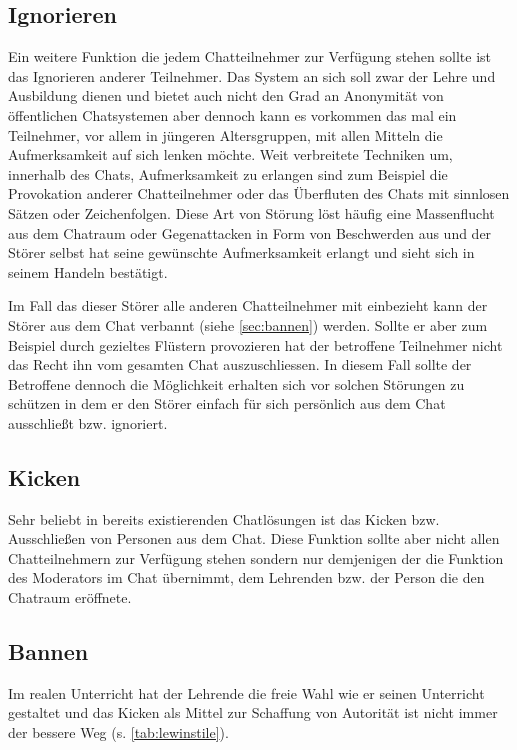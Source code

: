 \subsection{Ignorieren}
Ein weitere Funktion die jedem Chatteilnehmer zur Verf\"ugung stehen sollte ist das Ignorieren
anderer Teilnehmer. Das System an sich soll zwar der Lehre und Ausbildung dienen und bietet
auch nicht den Grad an Anonymit\"at von \"offentlichen Chatsystemen aber dennoch kann es
vorkommen das mal ein Teilnehmer, vor allem in j\"ungeren Altersgruppen, mit allen Mitteln die 
Aufmerksamkeit auf sich lenken m\"ochte. Weit verbreitete Techniken um, innerhalb des Chats, 
Aufmerksamkeit zu erlangen sind zum Beispiel die Provokation anderer Chatteilnehmer oder das 
\"Uberfluten des Chats mit sinnlosen S\"atzen oder Zeichenfolgen. Diese Art von St\"orung l\"ost 
h\"aufig eine Massenflucht aus dem Chatraum oder Gegenattacken in Form von Beschwerden aus und 
der St\"orer selbst hat seine gew\"unschte Aufmerksamkeit erlangt und sieht sich in seinem Handeln 
best\"atigt.

Im Fall das dieser St\"orer alle anderen Chatteilnehmer mit einbezieht kann der St\"orer aus dem Chat 
verbannt (siehe \ref{sec:bannen}) werden. Sollte er aber zum Beispiel durch gezieltes Fl\"ustern
provozieren hat der betroffene Teilnehmer nicht das Recht ihn vom gesamten Chat auszuschliessen. In
diesem Fall sollte der Betroffene dennoch die M\"oglichkeit erhalten sich vor solchen St\"orungen
zu sch\"utzen in dem er den St\"orer einfach f\"ur sich pers\"onlich aus dem Chat ausschlie{\ss}t
bzw. ignoriert.

\subsection{Kicken}
Sehr beliebt in bereits existierenden Chatl\"osungen ist das Kicken bzw. Ausschlie{\ss}en von Personen
aus dem Chat. Diese Funktion sollte aber nicht allen Chatteilnehmern zur Verf\"ugung stehen
sondern nur demjenigen der die Funktion des Moderators im Chat \"ubernimmt, dem Lehrenden bzw.
der Person die den Chatraum er\"offnete.


\subsection{\label{sec:bannen}Bannen}

Im realen Unterricht hat der Lehrende die freie Wahl wie er seinen Unterricht gestaltet und das
Kicken als Mittel zur Schaffung von Autorit\"at ist nicht immer der bessere Weg (s. \ref{tab:lewinstile}).